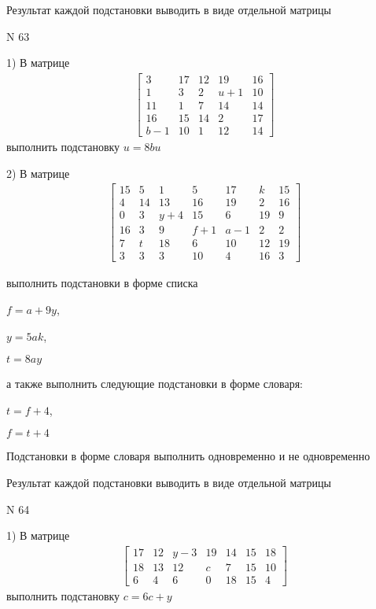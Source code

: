 \documentclass[11pt]{report}
\begin{document}
    Результат каждой подстановки выводить в виде отдельной матрицы

\newpage
N 63


    1) В матрице
\begin{align*}
\left[\begin{matrix}3 & 17 & 12 & 19 & 16\\1 & 3 & 2 & u + 1 & 10\\11 & 1 & 7 & 14 & 14\\16 & 15 & 14 & 2 & 17\\b - 1 & 10 & 1 & 12 & 14\end{matrix}\right]
\end{align*}
выполнить подстановку $u=8 b u$


    2) В матрице
\begin{align*}
\left[\begin{matrix}15 & 5 & 1 & 5 & 17 & k & 15\\4 & 14 & 13 & 16 & 19 & 2 & 16\\0 & 3 & y + 4 & 15 & 6 & 19 & 9\\16 & 3 & 9 & f + 1 & a - 1 & 2 & 2\\7 & t & 18 & 6 & 10 & 12 & 19\\3 & 3 & 3 & 10 & 4 & 16 & 3\end{matrix}\right]
\end{align*}

выполнить подстановки в форме списка

$f=a + 9 y$,

$y=5 a k$,

$t=8 a y$

а также выполнить следующие подстановки в форме словаря:

$t=f + 4$,

$f=t + 4$


    Подстановки в форме словаря выполнить одновременно и не одновременно


    Результат каждой подстановки выводить в виде отдельной матрицы

\newpage
N 64


    1) В матрице
\begin{align*}
\left[\begin{matrix}17 & 12 & y - 3 & 19 & 14 & 15 & 18\\18 & 13 & 12 & c & 7 & 15 & 10\\6 & 4 & 6 & 0 & 18 & 15 & 4\end{matrix}\right]
\end{align*}
выполнить подстановку $c=6 c + y$
\end{document}
